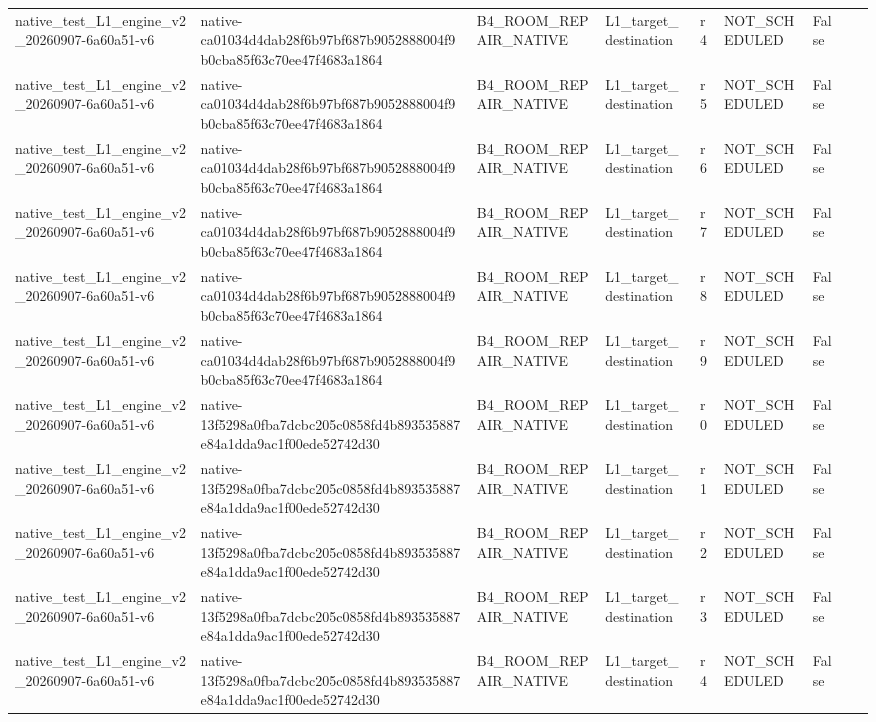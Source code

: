\begin{tabular}{lllllllll}
native\_test\_L1\_engine\_v2\_20260907-6a60a51-v6 & native-ca01034d4dab28f6b97bf687b9052888004f9b0cba85f63c70ee47f4683a1864 & B4\_ROOM\_REPAIR\_NATIVE & L1\_target\_destination & r4 & NOT\_SCHEDULED & False &  &  \\
native\_test\_L1\_engine\_v2\_20260907-6a60a51-v6 & native-ca01034d4dab28f6b97bf687b9052888004f9b0cba85f63c70ee47f4683a1864 & B4\_ROOM\_REPAIR\_NATIVE & L1\_target\_destination & r5 & NOT\_SCHEDULED & False &  &  \\
native\_test\_L1\_engine\_v2\_20260907-6a60a51-v6 & native-ca01034d4dab28f6b97bf687b9052888004f9b0cba85f63c70ee47f4683a1864 & B4\_ROOM\_REPAIR\_NATIVE & L1\_target\_destination & r6 & NOT\_SCHEDULED & False &  &  \\
native\_test\_L1\_engine\_v2\_20260907-6a60a51-v6 & native-ca01034d4dab28f6b97bf687b9052888004f9b0cba85f63c70ee47f4683a1864 & B4\_ROOM\_REPAIR\_NATIVE & L1\_target\_destination & r7 & NOT\_SCHEDULED & False &  &  \\
native\_test\_L1\_engine\_v2\_20260907-6a60a51-v6 & native-ca01034d4dab28f6b97bf687b9052888004f9b0cba85f63c70ee47f4683a1864 & B4\_ROOM\_REPAIR\_NATIVE & L1\_target\_destination & r8 & NOT\_SCHEDULED & False &  &  \\
native\_test\_L1\_engine\_v2\_20260907-6a60a51-v6 & native-ca01034d4dab28f6b97bf687b9052888004f9b0cba85f63c70ee47f4683a1864 & B4\_ROOM\_REPAIR\_NATIVE & L1\_target\_destination & r9 & NOT\_SCHEDULED & False &  &  \\
native\_test\_L1\_engine\_v2\_20260907-6a60a51-v6 & native-13f5298a0fba7dcbc205c0858fd4b893535887e84a1dda9ac1f00ede52742d30 & B4\_ROOM\_REPAIR\_NATIVE & L1\_target\_destination & r0 & NOT\_SCHEDULED & False &  &  \\
native\_test\_L1\_engine\_v2\_20260907-6a60a51-v6 & native-13f5298a0fba7dcbc205c0858fd4b893535887e84a1dda9ac1f00ede52742d30 & B4\_ROOM\_REPAIR\_NATIVE & L1\_target\_destination & r1 & NOT\_SCHEDULED & False &  &  \\
native\_test\_L1\_engine\_v2\_20260907-6a60a51-v6 & native-13f5298a0fba7dcbc205c0858fd4b893535887e84a1dda9ac1f00ede52742d30 & B4\_ROOM\_REPAIR\_NATIVE & L1\_target\_destination & r2 & NOT\_SCHEDULED & False &  &  \\
native\_test\_L1\_engine\_v2\_20260907-6a60a51-v6 & native-13f5298a0fba7dcbc205c0858fd4b893535887e84a1dda9ac1f00ede52742d30 & B4\_ROOM\_REPAIR\_NATIVE & L1\_target\_destination & r3 & NOT\_SCHEDULED & False &  &  \\
native\_test\_L1\_engine\_v2\_20260907-6a60a51-v6 & native-13f5298a0fba7dcbc205c0858fd4b893535887e84a1dda9ac1f00ede52742d30 & B4\_ROOM\_REPAIR\_NATIVE & L1\_target\_destination & r4 & NOT\_SCHEDULED & False &  &  \\

\end{tabular}
